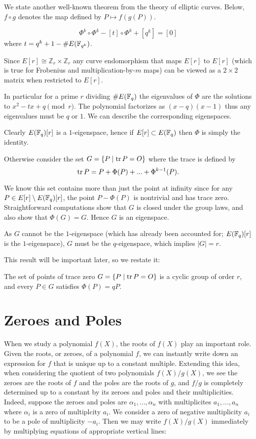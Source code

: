 We state another well-known theorem from the theory of elliptic curves.
Below, $f \circ g$ denotes the map defined by $P\mapsto f(g(P))$.

\begin{theorem}
[Hasse]
\[ \Phi^k \circ \Phi^k - [t] \circ \Phi^k + [q^k] = [0] \]
where $t = q^k + 1 - \#E(\mathbb{F}_{q^k})$.
\end{theorem}

Since $E[r] \cong \mathbb{Z}_r \times \mathbb{Z}_r$ any curve endomorphism
that maps $E[r]$ to $E[r]$ (which is true for Frobenius and
multiplication-by-$m$ maps)
can be viewed as a $2\times 2$ matrix when restricted to $E[r]$.

In particular for a prime $r$ dividing $\#E(\mathbb{F}_q)$ the eigenvalues
of $\Phi$ are the solutions to $x^2 - t x + q \pmod{r}$.
The polynomial factorizes as $(x - q)(x - 1)$ thus any eigenvalues
must be $q$ or $1$. We can describe the corresponding eigenspaces.

Clearly $E(\mathbb{F}_q)[r]$ is a $1$-eigenspace, hence if $E[r] \subset E(\mathbb{F}_q)$
then $\Phi$ is simply the identity.

Otherwise consider the set $G = \{P \mid \mathop{\rm tr} P = O \}$
where the trace is defined by
\[ \mathop{\rm tr} P = P + \Phi(P) + ... + \Phi^{k-1}(P)  .\]

We know this set contains more than just the point at infinity
since for any $P \in E[r] \setminus E(\mathbb{F}_q)[r]$,
the point $P - \Phi(P)$ is nontrivial and has trace zero.
Straightforward computations show that $G$ is closed under the group laws,
and also show that $\Phi(G) = G$. Hence $G$ is an eigenspace.

As $G$ cannot be the $1$-eigenspace (which has already been accounted for;
$E(\mathbb{F}_q)[r]$ is the $1$-eigenspace), $G$ must be the $q$-eigenspace,
which implies $|G| = r$.

This result will be important later, so we restate it:

\begin{theorem}
The set of points of trace zero
$G = \{P \mid \mathop{\rm tr} P = O \}$ is a cyclic group of order $r$,
and every $P \in G$ satisfies $\Phi(P) = q P$.
\end{theorem}

\section {Zeroes and Poles}

When we study a polynomial $f(X)$, the roots of $f(X)$ play an important
role. Given the roots, or zeroes, of a polynomial $f$, we can
instantly write down an expression for $f$ that is unique up to a constant
multiple.
Extending this idea, when considering the quotient of
two polynomials $f(X)/g(X)$, we see the zeroes are the roots of $f$ and
the poles are the roots of $g$, and $f/g$ is completely determined up
to a constant by its zeroes and poles and their multiplicities.
Indeed, suppose the zeroes and poles are $\alpha_1,...,\alpha_n$
with multiplicites $a_1,...,a_n$ where $\alpha_i$ is a zero of multiplcity
$a_i$. We consider a zero of negative multiplicity $a_i$ to be a pole
of multiplicity $-a_i$. Then we may write $f(X)/g(X)$ immediately
by multiplying equations of appropriate vertical lines:

